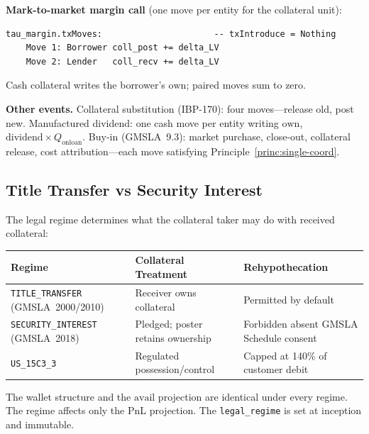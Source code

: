 \documentclass[11pt,a4paper]{article}
\begin{document}
\noindent\textbf{Mark-to-market margin call} (one move per entity for the collateral unit):
\begin{lstlisting}
tau_margin.txMoves:                      -- txIntroduce = Nothing
    Move 1: Borrower coll_post += delta_LV
    Move 2: Lender   coll_recv += delta_LV
\end{lstlisting}
Cash collateral writes the borrower's $\mathrm{own}$; paired moves sum to zero.

\noindent\textbf{Other events.} Collateral substitution (IBP-170): four moves---release old, post new. Manufactured dividend: one cash move per entity writing $\mathrm{own}$, $\text{dividend}\times Q_{\mathrm{onloan}}$. Buy-in (GMSLA~9.3): market purchase, close-out, collateral release, cost attribution---each move satisfying Principle~\ref{princ:single-coord}.

\subsection{Title Transfer vs Security Interest}
\label{sec:sbl-title-transfer}

The legal regime determines what the collateral taker may do with received collateral:

\begin{center}
\small
\begin{tabular}{l p{4.2cm} p{4.2cm}}
\toprule
\textbf{Regime} & \textbf{Collateral Treatment} & \textbf{Rehypothecation} \\
\midrule
\texttt{TITLE\_TRANSFER} (GMSLA~2000/2010) & Receiver owns collateral & Permitted by default \\
\texttt{SECURITY\_INTEREST} (GMSLA~2018) & Pledged; poster retains ownership & Forbidden absent GMSLA Schedule consent \\
\texttt{US\_15C3\_3} & Regulated possession/control & Capped at 140\% of customer debit \\
\bottomrule
\end{tabular}
\end{center}

The wallet structure and the $\mathrm{avail}$ projection are identical under every regime. The regime affects only the PnL projection. The \texttt{legal\_regime} is set at inception and immutable.
\end{document}
